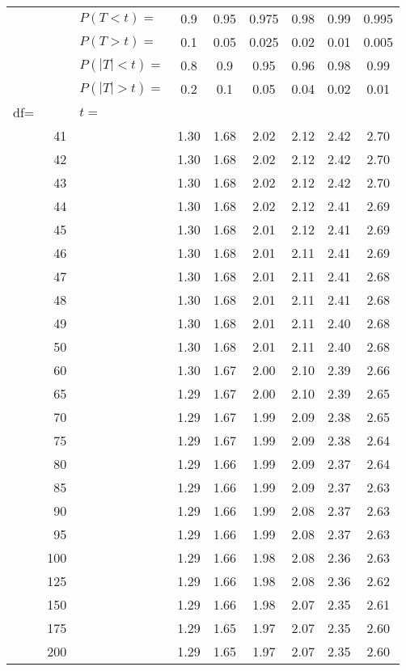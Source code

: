 \documentclass[12pt,letterpaper]{article}
\begin{document}
\begin{center}
\begin{tabular}{|l r | l c c c c c c|}\hline
&& $P(T<t)=$ & 0.9 & 0.95 & 0.975 & 0.98 & 0.99 & 0.995\\
&& $P(T>t)=$ & 0.1 & 0.05 & 0.025 & 0.02 & 0.01 & 0.005\\
&& $P(|T|<t)=$ & 0.8 & 0.9 & 0.95 & 0.96 & 0.98 & 0.99\\
&& $P(|T|>t)=$ & 0.2 & 0.1 & 0.05 & 0.04 & 0.02 & 0.01\\\hline
df= && $t=$ & & & & & &\\ 
&41&& 1.30 & 1.68 & 2.02 & 2.12 & 2.42 & 2.70\\ 
&42&& 1.30 & 1.68 & 2.02 & 2.12 & 2.42 & 2.70\\ 
&43&& 1.30 & 1.68 & 2.02 & 2.12 & 2.42 & 2.70\\ 
&44&& 1.30 & 1.68 & 2.02 & 2.12 & 2.41 & 2.69\\ 
&45&& 1.30 & 1.68 & 2.01 & 2.12 & 2.41 & 2.69\\ 
&46&& 1.30 & 1.68 & 2.01 & 2.11 & 2.41 & 2.69\\ 
&47&& 1.30 & 1.68 & 2.01 & 2.11 & 2.41 & 2.68\\ 
&48&& 1.30 & 1.68 & 2.01 & 2.11 & 2.41 & 2.68\\ 
&49&& 1.30 & 1.68 & 2.01 & 2.11 & 2.40 & 2.68\\ 
&50&& 1.30 & 1.68 & 2.01 & 2.11 & 2.40 & 2.68\\ 
&60&& 1.30 & 1.67 & 2.00 & 2.10 & 2.39 & 2.66\\ 
&65&& 1.29 & 1.67 & 2.00 & 2.10 & 2.39 & 2.65\\ 
&70&& 1.29 & 1.67 & 1.99 & 2.09 & 2.38 & 2.65\\ 
&75&& 1.29 & 1.67 & 1.99 & 2.09 & 2.38 & 2.64\\ 
&80&& 1.29 & 1.66 & 1.99 & 2.09 & 2.37 & 2.64\\ 
&85&& 1.29 & 1.66 & 1.99 & 2.09 & 2.37 & 2.63\\ 
&90&& 1.29 & 1.66 & 1.99 & 2.08 & 2.37 & 2.63\\ 
&95&& 1.29 & 1.66 & 1.99 & 2.08 & 2.37 & 2.63\\ 
&100&& 1.29 & 1.66 & 1.98 & 2.08 & 2.36 & 2.63\\ 
&125&& 1.29 & 1.66 & 1.98 & 2.08 & 2.36 & 2.62\\ 
&150&& 1.29 & 1.66 & 1.98 & 2.07 & 2.35 & 2.61\\ 
&175&& 1.29 & 1.65 & 1.97 & 2.07 & 2.35 & 2.60\\ 
&200&& 1.29 & 1.65 & 1.97 & 2.07 & 2.35 & 2.60\\ 

\end{tabular}
\end{center}
\end{document}
